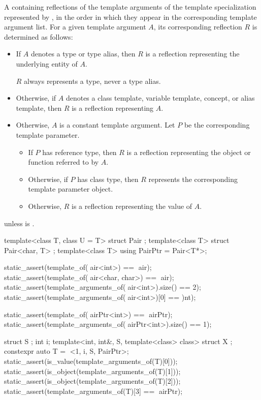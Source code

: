 \begin{itemdescr}
\pnum
\returns
A  containing reflections
of the template arguments
of the template specialization represented by ,
in the order in which they appear in the corresponding template argument list.
For a given template argument $A$,
its corresponding reflection $R$ is determined as follows:
\begin{itemize}
\item
  If $A$ denotes a type or type alias,
  then $R$ is a reflection representing the underlying entity of $A$.
  \begin{note}
  $R$ always represents a type, never a type alias.
  \end{note}
\item
  Otherwise, if $A$ denotes a
  class template,
  variable template,
  concept, or
  alias template,
  then $R$ is a reflection representing $A$.
\item
  Otherwise, $A$ is a constant template argument.
  Let $P$ be the corresponding template parameter.
  \begin{itemize}
  \item
    If $P$ has reference type,
    then $R$ is a reflection
    representing the object or function referred to by $A$.
  \item
    Otherwise, if $P$ has class type,
    then $R$ represents the corresponding template parameter object.
  \item
    Otherwise, $R$ is a reflection representing the value of $A$.
  \end{itemize}
\end{itemize}

\pnum
\throws
{} unless
 is .

\pnum
\begin{example}
\begin{codeblock}
template<class T, class U = T> struct Pair { };
template<class T> struct Pair<char, T> { };
template<class T> using PairPtr = Pair<T*>;

static_assert(template_of(^^Pair<int>) == ^^Pair);
static_assert(template_of(^^Pair<char, char>) == ^^Pair);
static_assert(template_arguments_of(^^Pair<int>).size() == 2);
static_assert(template_arguments_of(^^Pair<int>)[0] == ^^int);

static_assert(template_of(^^PairPtr<int>) == ^^PairPtr);
static_assert(template_arguments_of(^^PairPtr<int>).size() == 1);

struct S { };
int i;
template<int, int&, S, template<class> class>
  struct X { };
constexpr auto T = ^^X<1, i, S{}, PairPtr>;
static_assert(is_value(template_arguments_of(T)[0]));
static_assert(is_object(template_arguments_of(T)[1]));
static_assert(is_object(template_arguments_of(T)[2]));
static_assert(template_arguments_of(T)[3] == ^^PairPtr);
\end{codeblock}
\end{example}
\end{itemdescr}

